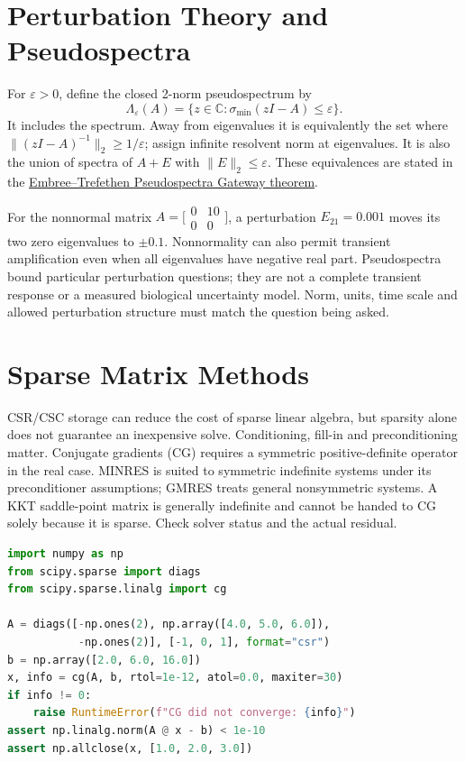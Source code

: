 \documentclass[10pt,letterpaper,openany]{book}
\theoremstyle{plain}
\theoremstyle{definition}
\theoremstyle{remark}
\begin{document}
\section{Perturbation Theory and Pseudospectra}

For $\varepsilon>0$, define the closed 2-norm pseudospectrum by
\[
 \Lambda_\varepsilon(A)=
 \{z\in\mathbb C:\sigma_{\min}(zI-A)\leq\varepsilon\}.
\]
It includes the spectrum. Away from eigenvalues it is equivalently the set
where $\|(zI-A)^{-1}\|_2\geq1/\varepsilon$; assign infinite resolvent norm at
eigenvalues. It is also the union of spectra of $A+E$ with $\|E\|_2\leq\varepsilon$.
These equivalences are stated in the
\href{https://www.cs.ox.ac.uk/pseudospectra/thms/thm1.pdf}{Embree--Trefethen Pseudospectra Gateway theorem}.

For the nonnormal matrix $A=\bigl[\begin{smallmatrix}0&10\\0&0\end{smallmatrix}\bigr]$,
a perturbation $E_{21}=0.001$ moves its two zero eigenvalues to $\pm0.1$.
Nonnormality can also permit transient amplification even when all eigenvalues
have negative real part. Pseudospectra bound particular perturbation questions;
they are not a complete transient response or a measured biological uncertainty
model. Norm, units, time scale and allowed perturbation structure must match the
question being asked.

\section{Sparse Matrix Methods}

CSR/CSC storage can reduce the cost of sparse linear algebra, but sparsity alone
does not guarantee an inexpensive solve. Conditioning, fill-in and preconditioning
matter. Conjugate gradients (CG) requires a symmetric positive-definite operator
in the real case. MINRES is suited to symmetric indefinite systems under its
preconditioner assumptions; GMRES treats general nonsymmetric systems. A KKT
saddle-point matrix is generally indefinite and cannot be handed to CG solely
because it is sparse. Check solver status and the actual residual.

\noindent\begin{minipage}{\linewidth}
\begin{example}\label{app-sparse-solve}
\leavevmode\par
\begin{lstlisting}[language=Python]
import numpy as np
from scipy.sparse import diags
from scipy.sparse.linalg import cg

A = diags([-np.ones(2), np.array([4.0, 5.0, 6.0]),
           -np.ones(2)], [-1, 0, 1], format="csr")
b = np.array([2.0, 6.0, 16.0])
x, info = cg(A, b, rtol=1e-12, atol=0.0, maxiter=30)
if info != 0:
    raise RuntimeError(f"CG did not converge: {info}")
assert np.linalg.norm(A @ x - b) < 1e-10
assert np.allclose(x, [1.0, 2.0, 3.0])
\end{lstlisting}
\end{example}
\end{minipage}
\end{document}
